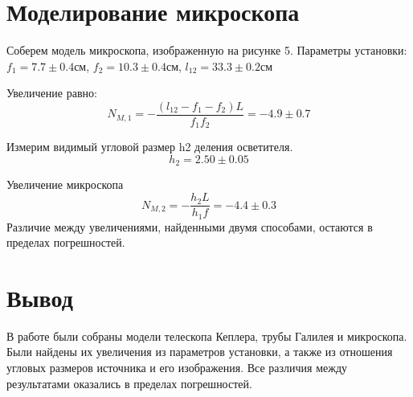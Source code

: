 \documentclass[14pt,a4paper]{scrartcl}
\begin{document}
\section{Моделирование микроскопа}
Соберем модель микроскопа, изображенную на рисунке 5. Параметры установки: 
$f_{1}=7.7 \pm 0.4$см, $f_{2}=10.3 \pm 0.4$см, $l_{12}=33.3 \pm 0.2$см
\begin{enumerate}
Увеличение равно: 
$$
N_{M, 1}=-\frac{\left(l_{12}-f_{1}-f_{2}\right) L}{f_{1} f_{2}}=-4.9 \pm 0.7
$$
   
   
   Измерим видимый угловой размер h2 деления осветителя.
   $$
h_{2}=2.50 \pm 0.05
$$

Увеличение микроскопа
$$
N_{M, 2}=-\frac{h_{2} L}{h_{1} f}=-4.4 \pm 0.3
$$
Различие между увеличениями, найденными двумя способами, остаются в пределах
погрешностей.
\end{enumerate}

\section{Вывод}
В работе были собраны модели телескопа Кеплера, трубы Галилея и микроскопа. Были
найдены их увеличения из параметров установки, а также из отношения угловых размеров
источника и его изображения. Все различия между результатами оказались в пределах
погрешностей.

    
\end{document}
